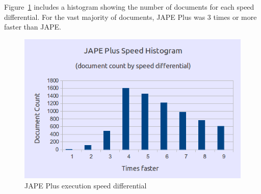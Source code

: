 Figure~\ref{fig:jape:plus-histogram} includes a histogram showing the number of
documents for each speed differential. For the vast majority of documents, JAPE
Plus was 3 times or more faster than JAPE.

\begin{figure}[htb]
\begin{center}
\includegraphics[scale=0.5]{jape-v-japeplus-histogram.png}
\caption{JAPE Plus execution speed differential}
\label{fig:jape:plus-histogram}
\end{center}
\end{figure}
 
